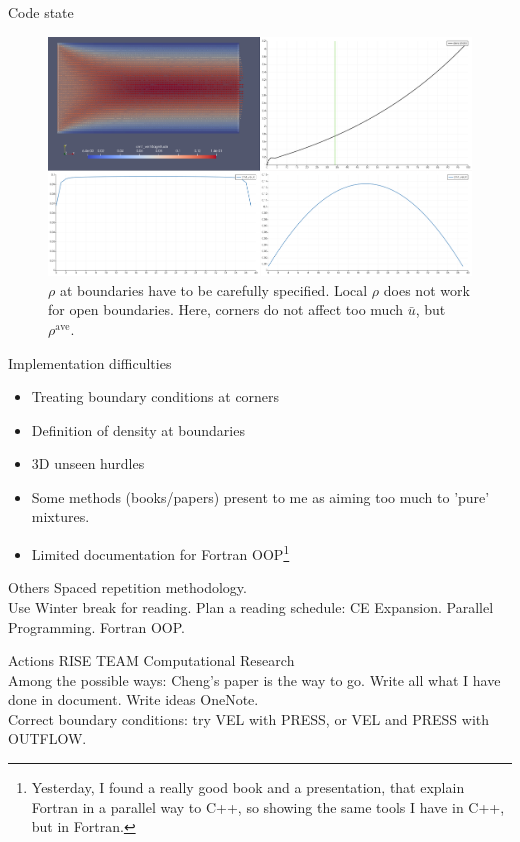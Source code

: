 \documentclass{beamer}
\begin{document}
	\begin{frame}{Code state}
		\begin{figure}
			\includegraphics[scale=0.16]{pics/bcCorrected.png}
			\caption{$\rho$ at boundaries have to be carefully specified. Local $\rho$ does not work for open boundaries. Here, corners do not affect too much $\bar{u}$, but $\rho^{\text{ave}}$.}
		\end{figure}
	\end{frame}

	\begin{frame}{Implementation difficulties}
		\begin{itemize}
			\item Treating boundary conditions at corners
			\item Definition of density at boundaries
			\item 3D unseen hurdles
			\item Some methods (books/papers) present to me as aiming too much to 'pure' mixtures.
			\item \alert{Limited documentation for Fortran OOP}\footnote{\tiny Yesterday, I found a really good book and a presentation, that explain Fortran in a parallel way to C++, so showing the same tools I have in C++, but in Fortran.}
		\end{itemize}
	\end{frame}
	
	\begin{frame}{Others}
		Spaced repetition methodology.\\
		Use Winter break for reading. Plan a reading schedule: CE Expansion. Parallel Programming. Fortran OOP. 
	\end{frame}
	
	\begin{frame}{Actions}
		RISE TEAM Computational Research\\
		Among the possible ways: Cheng's paper is the way to go. Write all what I have done in document. Write ideas OneNote.\\
		Correct boundary conditions: try VEL with PRESS, or VEL and PRESS with OUTFLOW.
	\end{frame}
	
\end{document}
